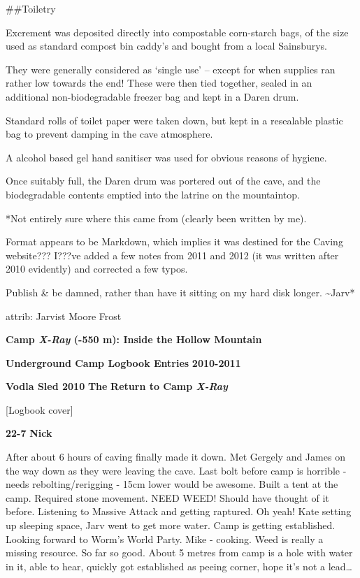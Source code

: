 \#\#Toiletry

Excrement was deposited directly into compostable corn-starch bags, of
the size used as standard compost bin caddy's and bought from a local
Sainsburys.

They were generally considered as `single use' -- except for when
supplies ran rather low towards the end! These were then tied together,
sealed in an additional non-biodegradable freezer bag and kept in a
Daren drum.

Standard rolls of toilet paper were taken down, but kept in a resealable
plastic bag to prevent damping in the cave atmosphere.

A alcohol based gel hand sanitiser was used for obvious reasons of
hygiene.

Once suitably full, the Daren drum was portered out of the cave, and the
biodegradable contents emptied into the latrine on the mountaintop.

*Not entirely sure where this came from (clearly been written by me).

Format appears to be Markdown, which implies it was destined for the
Caving website??? I???ve added a few notes from 2011 and 2012 (it was
written after 2010 evidently) and corrected a few typos.

Publish \& be damned, rather than have it sitting on my hard disk
longer. \textasciitilde{}Jarv*

attrib: Jarvist Moore Frost

\textbf{Camp \emph{X-Ray} (-550 m): Inside the Hollow Mountain}

\textbf{Underground Camp Logbook Entries} \textbf{2010-2011}

\textbf{Vodla Sled 2010} \textbf{The} \textbf{Return to Camp
\emph{X-Ray}}

{[}Logbook cover{]}

\textbf{22-7} \textbf{Nick}

After about 6 hours of caving finally made it down. Met Gergely and
James on the way down as they were leaving the cave. Last bolt before
camp is horrible - needs rebolting/rerigging - 15cm lower would be
awesome. Built a tent at the camp. Required stone movement. NEED WEED!
Should have thought of it before. Listening to Massive Attack and
getting raptured. Oh yeah! Kate setting up sleeping space, Jarv went to
get more water. Camp is getting established. Looking forward to Worm's
World Party. Mike - cooking. Weed is really a missing resource. So far
so good. About 5 metres from camp is a hole with water in it, able to
hear, quickly got established as peeing corner, hope it's not a
lead\ldots{}

